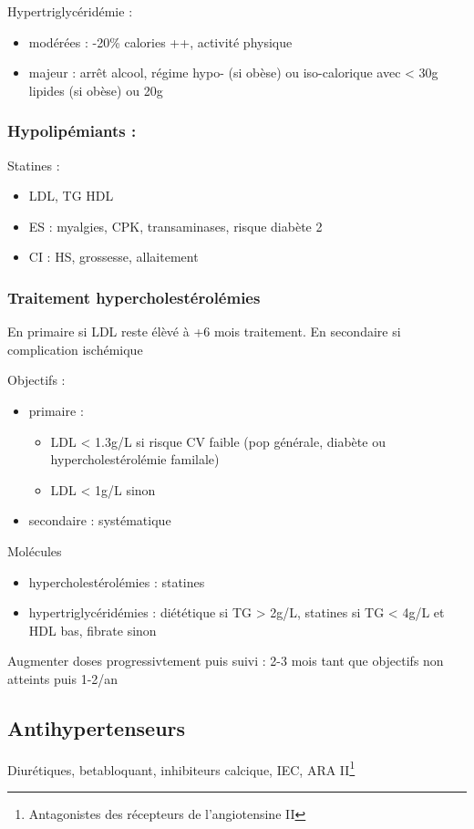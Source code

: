 \documentclass[11pt]{article}
\begin{document}
Hypertriglycéridémie : 
\begin{itemize}
\item modérées : -20\% calories ++, \inc activité physique
\item majeur : arrêt alcool, régime hypo- (si obèse) ou iso-calorique avec < 30g
lipides (si obèse) ou 20g
\end{itemize}

\subsubsection{Hypolipémiants :}
\label{sec:orge1a834c}
Statines :
\begin{itemize}
\item \dec LDL, \dec TG \inc HDL
\item ES : myalgies, \inc CPK, \inc transaminases, \inc risque diabète 2
\item CI : HS, grossesse, allaitement
\end{itemize}
\subsubsection{Traitement hypercholestérolémies}
\label{sec:orgdd266b6}
En primaire si LDL reste élèvé à +6 mois traitement. En secondaire si complication ischémique

Objectifs :
\begin{itemize}
\item primaire : 
\begin{itemize}
\item LDL < 1.3g/L si risque CV faible (pop générale, diabète ou hypercholestérolémie familale)
\item LDL < 1g/L sinon
\end{itemize}
\item secondaire : systématique
\end{itemize}

Molécules
\begin{itemize}
\item hypercholestérolémies : statines
\item hypertriglycéridémies : diététique si TG > 2g/L, statines si TG < 4g/L et HDL
bas, fibrate sinon
\end{itemize}

Augmenter doses progressivtement puis suivi : 2-3 mois tant que objectifs non
atteints puis 1-2/an

\subsection{Antihypertenseurs}
\label{sec:org3affa9d}
Diurétiques, betabloquant, inhibiteurs calcique, IEC, ARA II\footnote{Antagonistes des récepteurs de l'angiotensine II}
\end{document}
